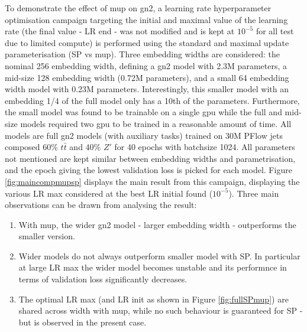 To demonstrate the effect of \gls{mup} on \gls{gn2}, a learning rate hyperparameter optimisation campaign targeting the initial and maximal value of the learning rate (the final value - LR end - was not modified and is kept at $10^{-5}$ for all test due to limited compute) is performed using the standard and maximal update parameterisation (SP vs \gls{mup}). Three embedding widths are considered: the nominal 256 embedding width, defining a \gls{gn2} model with 2.3M parameters, a mid-size 128 embedding width (0.72M parameters), and a small 64 embedding width model with 0.23M parameters. Interestingly, this smaller model with an embedding 1/4 of the full model only has a 10th of the parameters. Furthermore, the small model was found to be trainable on a single \gls{gpu} while the full and mid-size models required two \gls{gpu} to be trained in a reasonable amount of time. All models are full \gls{gn2} models (with auxiliary tasks) trained on 30M PFlow jets composed 60\% $t\bar{t}$ and 40\% $Z'$ for 40 epochs with batchsize 1024. All parameters not mentioned are kept similar between embedding widths and parametrisation, and the epoch giving the lowest validation loss is picked for each model. Figure \ref{fig:maincompmupsp} displays the main result from this campaign, displaying the various LR max considered at the best LR initial found ($10^{-5}$). Three main observations can be drawn from analysing the result:
\begin{enumerate}
  \item With \gls{mup}, the wider \gls{gn2} model - larger embedding width - outperforms the smaller version. 
  \item Wider models do not always outperform smaller model with SP. In particular at large LR max the wider model becomes unstable and its performnce in terms of validation loss significantly decreases.
  \item The optimal LR max (and LR init as shown in Figure \ref{fig:fullSPmup}) are shared across width with \gls{mup}, while no such behaviour is guaranteed for SP - but is observed in the present case.
\end{enumerate}

